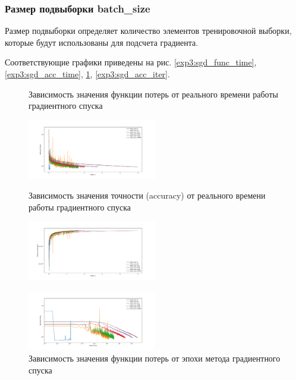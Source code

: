 \documentclass[a4paper, 11pt]{article}
\begin{document}
            \subsubsection{Размер подвыборки batch\_size}
                Размер подвыборки определяет количество элементов тренировочной выборки, которые будут использованы для подсчета градиента.
            
            Соответствующие графики приведены на рис. \ref{exp3:sgd_func_time}, \ref{exp3:sgd_acc_time}, \ref{exp3:sgd_func_iter}, \ref{exp3:sgd_acc_iter}.
            \begin{figure}[H] \label{exp1}
                \begin{multicols}{2}
                    \begin{center}
                        \caption{Зависимость значения функции потерь от реального времени работы градиентного спуска} \label{exp3:sgd_func_time}
                        \includegraphics[width=0.5\textwidth, height=0.25\textheight]{../graphs/exp3_func_SGD_bs_time_alpha=1_beta=0,01.pdf}
                        
                        \caption{Зависимость значения точности (accuracy) от реального времени работы градиентного спуска} \label{exp3:sgd_acc_time}
                        \includegraphics[width=0.5\textwidth, height=0.25\textheight]{../graphs/exp3_accuracy_SGD_bs_time_alpha=1_beta=0,01.pdf}
                        
                        \caption{Зависимость значения функции потерь от эпохи метода градиентного спуска} \label{exp3:sgd_func_iter}
                        \includegraphics[width=0.5\textwidth, height=0.25\textheight]{../graphs/exp3_func_SGD_bs_epoch_num_alpha=1_beta=0,01.pdf}
                        

\end{center}
\end{multicols}
\end{figure}
\end{document}
